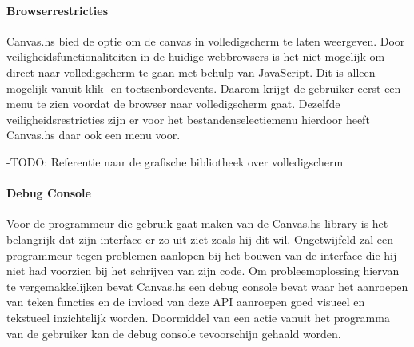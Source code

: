 \paragraph{Browserrestricties}
Canvas.hs bied de optie om de canvas in volledigscherm te laten weergeven. Door veiligheidsfunctionaliteiten in de huidige webbrowsers is het niet mogelijk om direct naar volledigscherm te gaan met behulp van JavaScript. Dit is alleen mogelijk vanuit klik- en toetsenbordevents. Daarom krijgt de gebruiker eerst een menu te zien voordat de browser naar volledigscherm gaat. Dezelfde veiligheidsrestricties zijn er voor het bestandenselectiemenu hierdoor heeft Canvas.hs daar ook een menu voor.

-TODO: Referentie naar de grafische bibliotheek over volledigscherm

\paragraph{Debug Console}
Voor de programmeur die gebruik gaat maken van de Canvas.hs library is het belangrijk dat zijn interface er zo uit ziet zoals hij dit wil. Ongetwijfeld zal een programmeur tegen problemen aanlopen bij het bouwen van de interface die hij niet had voorzien bij het schrijven van zijn code. Om probleemoplossing hiervan te vergemakkelijken bevat Canvas.hs een debug console bevat waar het aanroepen van teken functies en de invloed van deze API aanroepen goed visueel en tekstueel inzichtelijk worden. Doormiddel van een actie vanuit het programma van de gebruiker kan de debug console tevoorschijn gehaald worden.